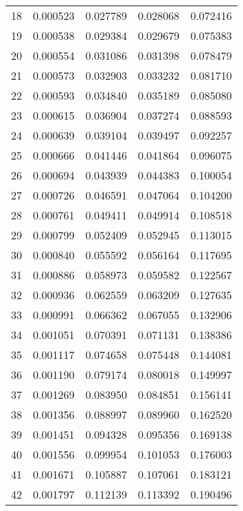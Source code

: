 \begin{center}
\begin{tabular}{|c|c|c|c|c|}
    18    & 0.000523   & 0.027789     & 0.028068     & 0.072416 \\ 
    19    & 0.000538   & 0.029384     & 0.029679     & 0.075383 \\ 
    20    & 0.000554   & 0.031086     & 0.031398     & 0.078479 \\ 
    21    & 0.000573   & 0.032903     & 0.033232     & 0.081710 \\ 
    22    & 0.000593   & 0.034840     & 0.035189     & 0.085080 \\ 
    23    & 0.000615   & 0.036904     & 0.037274     & 0.088593 \\ 
    24    & 0.000639   & 0.039104     & 0.039497     & 0.092257 \\ 
    25    & 0.000666   & 0.041446     & 0.041864     & 0.096075 \\ 
    26    & 0.000694   & 0.043939     & 0.044383     & 0.100054 \\ 
    27    & 0.000726   & 0.046591     & 0.047064     & 0.104200 \\ 
    28    & 0.000761   & 0.049411     & 0.049914     & 0.108518 \\ 
    29    & 0.000799   & 0.052409     & 0.052945     & 0.113015 \\ 
    30    & 0.000840   & 0.055592     & 0.056164     & 0.117695 \\ 
    31    & 0.000886   & 0.058973     & 0.059582     & 0.122567 \\ 
    32    & 0.000936   & 0.062559     & 0.063209     & 0.127635 \\ 
    33    & 0.000991   & 0.066362     & 0.067055     & 0.132906 \\ 
    34    & 0.001051   & 0.070391     & 0.071131     & 0.138386 \\ 
    35    & 0.001117   & 0.074658     & 0.075448     & 0.144081 \\ 
    36    & 0.001190   & 0.079174     & 0.080018     & 0.149997 \\ 
    37    & 0.001269   & 0.083950     & 0.084851     & 0.156141 \\ 
    38    & 0.001356   & 0.088997     & 0.089960     & 0.162520 \\ 
    39    & 0.001451   & 0.094328     & 0.095356     & 0.169138 \\ 
    40    & 0.001556   & 0.099954     & 0.101053     & 0.176003 \\ 
    41    & 0.001671   & 0.105887     & 0.107061     & 0.183121 \\ 
    42    & 0.001797   & 0.112139     & 0.113392     & 0.190496 \\ 

\end{tabular}
\end{center}
